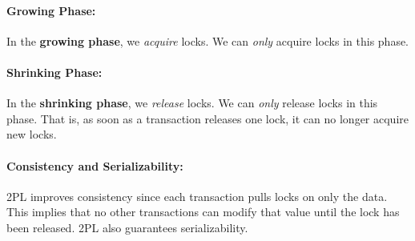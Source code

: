 \documentclass{report}
\renewcommand{\bf}[1]{\textbf{{#1}}}
\renewcommand{\it}[1]{\textit{{#1}}}
\begin{document}
\paragraph{Growing Phase:} In the \bf{growing phase}, we \it{acquire} locks. We can
\it{only} acquire locks in this phase.

\paragraph{Shrinking Phase:} In the \bf{shrinking phase}, we \it{release} locks.
We can \it{only} release locks in this phase. That is, as soon as a transaction
releases one lock, it can no longer acquire new locks.

\paragraph{Consistency and Serializability:} 2PL improves consistency since each
transaction pulls locks on only the data. This implies that no other
transactions can modify that value until the lock has been released. 2PL also
guarantees serializability.
\end{document}
